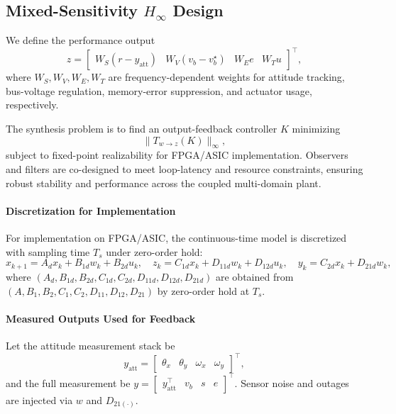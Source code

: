 \documentclass[conference]{IEEEtran}
\begin{document}
\subsection{Mixed-Sensitivity $H_\infty$ Design}

We define the performance output
\[
z = \begin{bmatrix}
W_S (r - y_{\mathrm{att}}) &
W_V (v_b - v_b^\star) &
W_E e &
W_T u
\end{bmatrix}^\top,
\]
where $W_S, W_V, W_E, W_T$ are frequency-dependent weights for
attitude tracking, bus-voltage regulation, memory-error suppression,
and actuator usage, respectively.

The synthesis problem is to find an output-feedback controller $K$
minimizing
\begin{equation}
\| T_{w \to z}(K) \|_\infty,
\end{equation}
subject to fixed-point realizability for FPGA/ASIC implementation.
Observers and filters are co-designed to meet loop-latency and
resource constraints, ensuring robust stability and performance
across the coupled multi-domain plant.

\paragraph*{Discretization for Implementation}
For implementation on FPGA/ASIC, the continuous-time model is discretized
with sampling time $T_s$ under zero-order hold:
\begin{equation}
x_{k+1}=A_d x_k + B_{1d} w_k + B_{2d} u_k,\quad
z_k = C_{1d} x_k + D_{11d} w_k + D_{12d} u_k,\quad
y_k = C_{2d} x_k + D_{21d} w_k,
\label{eq:disc}
\end{equation}
where $(A_d,B_{1d},B_{2d},C_{1d},C_{2d},D_{11d},D_{12d},D_{21d})$ are obtained from
$(A,B_1,B_2,C_1,C_2,D_{11},D_{12},D_{21})$ by zero-order hold at $T_s$.

\paragraph*{Measured Outputs Used for Feedback}
Let the attitude measurement stack be
\[
y_{\mathrm{att}}=\begin{bmatrix}\theta_x & \theta_y & \omega_x & \omega_y\end{bmatrix}^\top,
\]
and the full measurement be $y=\begin{bmatrix}y_{\mathrm{att}}^\top & v_b & s & e\end{bmatrix}^\top$.
Sensor noise and outages are injected via $w$ and $D_{21(\cdot)}$.
\end{document}
